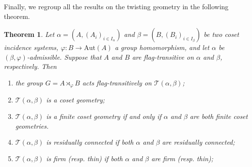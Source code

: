 \documentclass[11pt,letterpaper]{amsart}
\newtheorem{thm}[prop]{Theorem}
\newcommand{\TT}{\mathcal{T}}
\newcommand{\Aut}{\mathrm{Aut}}
\begin{document}
Finally, we regroup all the results on the twisting geometry in the following theorem.

\begin{thm}\label{thm:Twisting_FT_Geo_RC_FRM}
    Let $\alpha=(A,(A_i)_{i\in I_\alpha})$ and $\beta=(B,(B_i)_{i\in I_\beta})$ be two coset incidence systems, $\varphi: B\rightarrow \Aut(A)$ a group homomorphism, and let $\alpha$ be $(\beta,\varphi)$-admissible. Suppose that $A$ and $B$ are flag-transitive on $\alpha$ and $\beta$, respectively. Then
    \begin{enumerate}
        \item the group $G=A\rtimes_\varphi B$ acts flag-transitively on $\TT(\alpha,\beta)$;
        \item $\TT(\alpha,\beta)$ is a coset geometry;
        \item $\TT(\alpha,\beta)$ is a finite coset geometry if and only if $\alpha$ and $\beta$ are both finite coset geometries.
        \item $\TT(\alpha,\beta)$ is residually connected if both $\alpha$ and $\beta$ are residually connected;
        \item $\TT(\alpha,\beta)$ is firm (resp. thin) if both $\alpha$ and $\beta$ are firm (resp. thin);
    \end{enumerate}
\end{thm}
\end{document}

